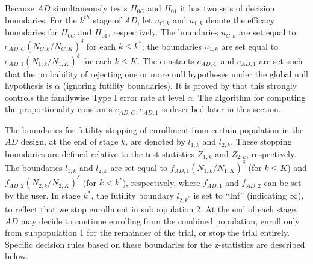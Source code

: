 \documentclass[article]{jss}
\begin{document}
Because $AD$ simultaneously tests $H_{0C}$ and $H_{01}$ it has two sets of decision boundaries. For the $k^{th}$ stage of $AD$, let $u_{C,k}$ and $u_{1,k}$ denote the efficacy boundaries for $H_{0C}$ and $H_{01}$, respectively. The boundaries $u_{C,k}$ 
 are set equal to $e_{AD,C}(N_{C,k}/N_{C,K})^{\delta}$ for each $k\leq k^*$; 
the boundaries $u_{1,k}$ are set equal to  $e_{AD,1}(N_{1,k}/N_{1,K})^{\delta}$ for each $k \leq K$. 
The constants $e_{AD,C}$  and $e_{AD,1}$ are set such that the probability of rejecting one or more null hypotheses under the global null hypothesis is $\alpha$ (ignoring futility boundaries). It is proved by \cite{Rosenblum2013AdaptMISTIE} that this strongly controls the familywise Type I error rate at level $\alpha$. The algorithm for computing the proportionality constants $e_{AD,C}, e_{AD,1}$ is described later in this section.


The boundaries for futility stopping of enrollment from certain population in the $AD$ design, at the end of stage $k$, are denoted by $l_{1,k}$ and $l_{2,k}$. These stopping boundaries are defined relative to the test statistics $Z_{1,k}$ and $Z_{2,k}$, respectively. The boundaries $l_{1,k}$ and $l_{2,k}$ are set equal to $f_{AD,1}(N_{1,k}/N_{1,K})^{\delta}$ (for $k\leq K$) and $f_{AD,2}(N_{2,k}/N_{2,K})^{\delta}$ (for $k < k^*$), respectively, where $f_{AD,1}$ and $f_{AD,2}$ can be set by the user.  In stage $k^*$, the futility boundary $l_{2,k^*}$ is set to ``Inf'' (indicating $\infty$), to reflect that we stop enrollment in subpopulation 2. At the end of each stage, $AD$ may decide to continue enrolling from the combined population, enroll only from subpopulation 1 for the remainder of the trial, or stop the trial entirely.  Specific decision rules based on these boundaries for the z-statistics are described below. %

\end{document}
